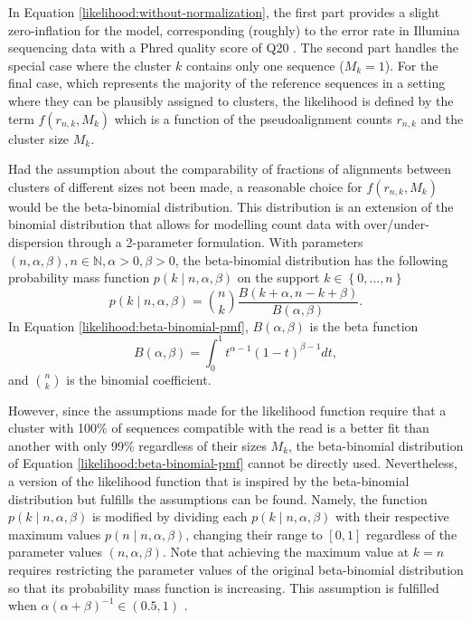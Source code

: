 \documentclass[officiallayout]{tktla}
\begin{document}
In Equation \eqref{likelihood:without-normalization}, the first part
provides a slight zero-inflation for the model, corresponding
(roughly) to the error rate in Illumina sequencing data with a Phred
quality score of Q20 \citep{ewing1998baseone, ewing1998basetwo}. The
second part handles the special case where the cluster $k$ contains
only one sequence ($M_{k} = 1$). For the final case, which represents
the majority of the reference sequences in a setting where they can be
plausibly assigned to clusters, the likelihood is defined by
the term $f\left(r_{n, k}, M_{k}\right)$ which is a function of the
pseudoalignment counts $r_{n, k}$ and the cluster size $M_{k}$.

Had the assumption about the comparability of fractions of
alignments between clusters of different sizes not been made, a reasonable choice
for $f\left(r_{n, k}, M_{k}\right)$ would be the beta-binomial
distribution. This distribution is an extension of the binomial
distribution that allows for modelling count data with
over/under-dispersion through a 2-parameter formulation. With
parameters $\left(n, \alpha, \beta\right), n \in \mathbb{N}, \alpha >
0, \beta > 0$, the beta-binomial distribution has the following
probability mass function $p\left(k \middle| n, \alpha, \beta\right)$
on the support $k \in \left\{0, \dots, n\right\}$
\begin{equation}
  \label{likelihood:beta-binomial-pmf}
  p\left(k \middle| n, \alpha, \beta\right) = \binom{n}{k}\frac{B\left(k + \alpha, n - k + \beta\right)}{B\left(\alpha, \beta\right)}.
\end{equation}
In Equation \eqref{likelihood:beta-binomial-pmf}, $B\left(\alpha, \beta\right)$ is the beta function
\begin{equation}
  \label{likelihood:beta-function}
  B\left(\alpha, \beta\right) = \int_{0}^{1}t^{\alpha - 1}\left(1 - t\right)^{\beta - 1}dt,
\end{equation}
and $\binom{n}{k}$ is the binomial coefficient.

However, since the assumptions made for the likelihood function
require that a cluster with 100\% of sequences compatible with the
read is a better fit than another with only 99\% regardless of their
sizes $M_{k}$, the beta-binomial distribution of Equation
\eqref{likelihood:beta-binomial-pmf} cannot be directly
used. Nevertheless, a version of the likelihood function that is
inspired by the beta-binomial distribution but fulfills the
assumptions can be found. Namely, the function $p\left(k \middle| n,
\alpha, \beta\right)$ is modified by dividing each $p\left(k \middle|
n, \alpha, \beta\right)$ with their respective maximum values
$p\left(n \middle| n, \alpha, \beta\right)$, changing their range to
$\left[0, 1\right]$ regardless of the parameter values $\left(n,
\alpha, \beta \right)$. Note that achieving the maximum value at $k =
n$ requires restricting the parameter values of the original
beta-binomial distribution so that its probability mass function is
increasing. This assumption is fulfilled when $\alpha\left(\alpha +
\beta\right)^{-1} \in \left(0.5, 1\right)$ \citep{berg1993condorcet}.
\end{document}
